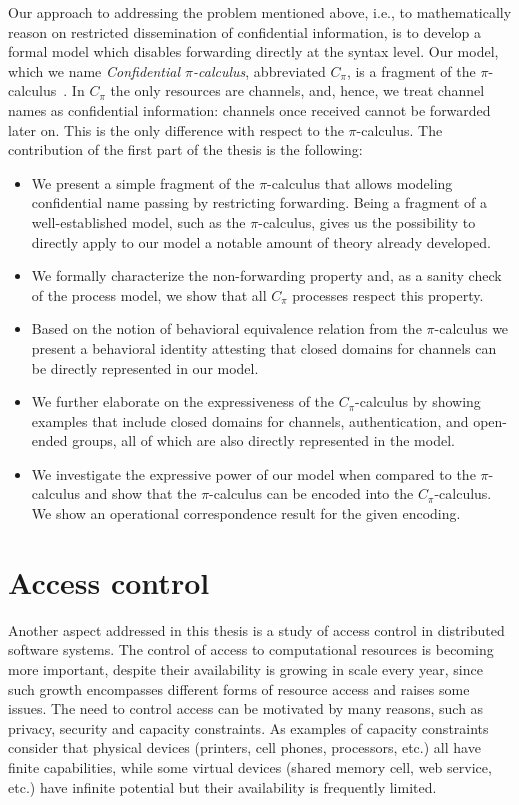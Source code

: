Our approach to addressing the problem mentioned above, i.e., to mathematically reason on restricted dissemination of confidential information, is to develop a formal model which disables forwarding directly at the syntax level. Our model, which we name  \emph{Confidential $\pi$-calculus},
 abbreviated $C_\pi$, is a fragment of the $\pi$-calculus~\cite{pi_calculus}. In $C_\pi$ the only resources are channels, and, hence, we treat channel names as confidential information: channels once received cannot be forwarded later on. This is the only difference with respect to the $\pi$-calculus.
 The contribution of the first part of the thesis is the following: 
 \begin{itemize}
 \item  We present a simple fragment of the $\pi$-calculus that allows modeling confidential name passing by restricting forwarding. Being a fragment of a well-established model, such as the $\pi$-calculus, gives us the possibility to directly apply to our model a notable amount of theory already developed.
 \item  We formally characterize the non-forwarding property and, as a sanity check of the process model, we show that all $C_\pi$ processes respect this property.
 \item  Based on the notion of behavioral equivalence relation from the $\pi$-calculus we present a behavioral identity attesting that closed domains for channels can be directly represented in our model.
 \item  We further elaborate on the expressiveness of the $C_\pi$-calculus by showing examples that include closed domains for channels, authentication, and open-ended groups, all of which are also directly represented in the model.
 \item We investigate the expressive power of our model when compared to the $\pi$-calculus and show that the $\pi$-calculus can be encoded into the $C_\pi$-calculus. We show an operational correspondence result for the given encoding.
 \end{itemize}






\section{Access control}\label{sec:intro_access_control}
Another aspect addressed in this thesis is a study of access control in distributed software systems.
The control of access to computational resources is becoming more important, 
despite their availability is growing in scale every year, since such growth encompasses different forms of resource access and raises some issues. 
The need to control access can be motivated by many reasons, such as privacy, security and capacity constraints. 
As examples of capacity constraints consider that physical devices (printers, cell phones, processors, etc.) all have finite capabilities, 
while some virtual devices (shared memory cell, web service, etc.) have infinite potential but their 
availability is frequently limited. 

